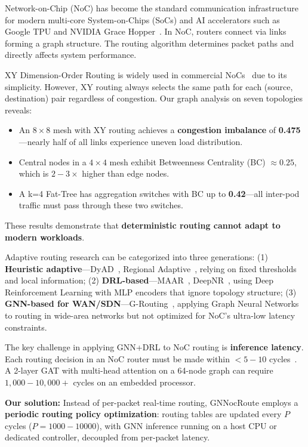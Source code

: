 \documentclass[conference]{IEEEtran}
\begin{document}
Network-on-Chip (NoC) has become the standard communication infrastructure for modern multi-core System-on-Chips (SoCs) and AI accelerators such as Google TPU and NVIDIA Grace Hopper~\cite{mirhoseini2021}. In NoC, routers connect via links forming a graph structure. The routing algorithm determines packet paths and directly affects system performance.

XY Dimension-Order Routing is widely used in commercial NoCs~\cite{wang2022maar} due to its simplicity. However, XY routing always selects the same path for each (source, destination) pair regardless of congestion. Our graph analysis on seven topologies reveals:

\begin{itemize}
 \item An $8\times8$ mesh with XY routing achieves a \textbf{congestion imbalance} of \textbf{0.475}---nearly half of all links experience uneven load distribution.
 \item Central nodes in a $4\times4$ mesh exhibit Betweenness Centrality (BC) $\approx 0.25$, which is $2-3\times$ higher than edge nodes.
 \item A k=4 Fat-Tree has aggregation switches with BC up to \textbf{0.42}---all inter-pod traffic must pass through these two switches.
\end{itemize}

These results demonstrate that \textbf{deterministic routing cannot adapt to modern workloads}.

Adaptive routing research can be categorized into three generations: (1) \textbf{Heuristic adaptive}---DyAD~\cite{dyad2004}, Regional Adaptive~\cite{ebrahimi2019}, relying on fixed thresholds and local information; (2) \textbf{DRL-based}---MAAR~\cite{wang2022maar}, DeepNR~\cite{deepnr2022}, using Deep Reinforcement Learning with MLP encoders that ignore topology structure; (3) \textbf{GNN-based for WAN/SDN}---G-Routing~\cite{g-routing2023}, applying Graph Neural Networks to routing in wide-area networks but not optimized for NoC's ultra-low latency constraints.

The key challenge in applying GNN+DRL to NoC routing is \textbf{inference latency}. Each routing decision in an NoC router must be made within $<5-10$ cycles~\cite{wang2022maar}. A 2-layer GAT with multi-head attention on a 64-node graph can require $1{,}000-10{,}000+$ cycles on an embedded processor.

\textbf{Our solution:} Instead of per-packet real-time routing, GNNocRoute employs a \textbf{periodic routing policy optimization}: routing tables are updated every $P$ cycles ($P=1000{-}10000$), with GNN inference running on a host CPU or dedicated controller, decoupled from per-packet latency.
\end{document}
